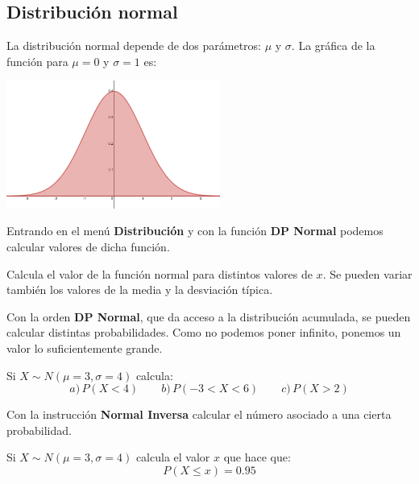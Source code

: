 \documentclass[12pt]{article}
\newenvironment{capitulo}{\begin{tcolorbox}[colback=blue!5!white,colframe=red!75!black]}{\end{tcolorbox}\bigskip}
\newenvironment{ejer}{\begin{tcolorbox}[center title, 
fonttitle=\sffamily\bfseries,colback=blue!5,colframe=orange]}{\end{tcolorbox}}
\begin{document}
\newpage

\begin{capitulo}
\section*{Distribución normal}
\end{capitulo}


La distribución normal depende de dos parámetros: $\mu$ y $\sigma$. La gráfica de la función para $\mu=0$ y $\sigma=1$ es:

\begin{center}
\includegraphics[width=7cm]{Normal.png} 
\end{center}

Entrando en el menú  \textbf{Distribución} y con la función \textbf{DP Normal} podemos calcular valores de dicha función.

\begin{ejer}

Calcula el valor de la función normal para distintos valores de $x$. Se pueden variar también los valores de la media y la desviación típica.


\end{ejer}

Con la orden \textbf{DP Normal}, que da acceso a la distribución acumulada, se pueden calcular distintas probabilidades. Como no podemos poner infinito, ponemos un valor lo suficientemente grande.

\begin{ejer}

Si $X \sim N(\mu=3, \sigma = 4)$ calcula:
\[
a)\,P(X<4)\qquad b)\, P(-3 < X< 6) \qquad c)\, P(X>2)
\]

\end{ejer}

Con la instrucción \textbf{Normal Inversa} calcular el número asociado a una cierta probabilidad.

\begin{ejer}

Si $X \sim N(\mu=3, \sigma = 4)$ calcula el valor $x$ que hace que:
\[
P(X \leq x) = 0.95
\]

\end{ejer}
\end{document}

